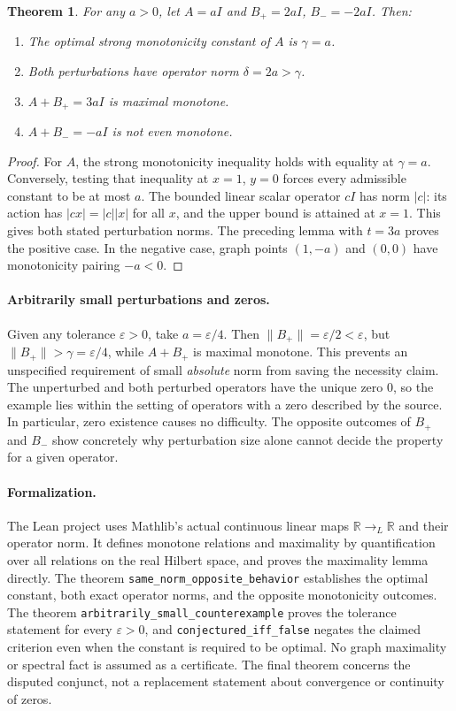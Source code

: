 \documentclass[11pt]{article}
\newtheorem{theorem}{Theorem}
\begin{document}
\begin{theorem}
For any $a>0$, let $A=aI$ and $B_+=2aI$, $B_-=-2aI$. Then:
\begin{enumerate}
\item The optimal strong monotonicity constant of $A$ is $\gamma=a$.
\item Both perturbations have operator norm $\delta=2a>\gamma$.
\item $A+B_+=3aI$ is maximal monotone.
\item $A+B_-=-aI$ is not even monotone.
\end{enumerate}
\end{theorem}
\begin{proof}
For $A$, the strong monotonicity inequality holds with equality at
$\gamma=a$. Conversely, testing that inequality at $x=1$, $y=0$ forces
every admissible constant to be at most $a$.
The bounded linear scalar operator $cI$ has norm $|c|$: its action has
$|cx|=|c||x|$ for all $x$, and the upper bound is attained at $x=1$.
This gives both stated perturbation norms. The preceding lemma with
$t=3a$ proves the positive case. In the negative case, graph points
$(1,-a)$ and $(0,0)$ have monotonicity pairing $-a<0$.
\end{proof}

\paragraph{Arbitrarily small perturbations and zeros.}
Given any tolerance $\varepsilon>0$, take $a=\varepsilon/4$.
Then $\|B_+\|=\varepsilon/2<\varepsilon$, but
$\|B_+\|>\gamma=\varepsilon/4$, while $A+B_+$ is maximal monotone.
This prevents an unspecified requirement of small \emph{absolute} norm from
saving the necessity claim. The unperturbed and both perturbed operators
have the unique zero $0$, so the example lies within the setting of operators
with a zero described by the source. In particular, zero existence causes
no difficulty. The opposite outcomes of $B_+$ and $B_-$ show concretely
why perturbation size alone cannot decide the property for a given operator.

\paragraph{Formalization.}
The Lean project uses Mathlib's actual continuous linear maps
$\mathbb R\to_L\mathbb R$ and their operator norm. It defines monotone
relations and maximality by quantification over all relations on the real
Hilbert space, and proves the maximality lemma directly.
The theorem \texttt{same\_norm\_opposite\_behavior} establishes the optimal
constant, both exact operator norms, and the opposite monotonicity outcomes.
The theorem \texttt{arbitrarily\_small\_counterexample} proves the tolerance
statement for every $\varepsilon>0$, and \texttt{conjectured\_iff\_false}
negates the claimed criterion even when the constant is required to be
optimal. No graph maximality or spectral fact is assumed as a certificate.
The final theorem concerns the disputed conjunct, not a replacement
statement about convergence or continuity of zeros.
\end{document}

